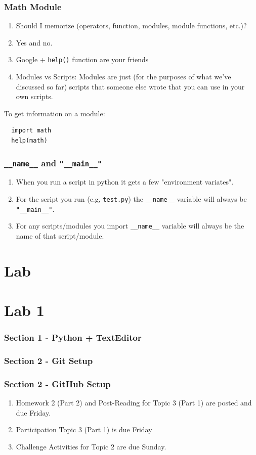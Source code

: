 \documentclass{beamer}
\begin{document}
\begin{frame}[fragile]
  \frametitle{Math Module}
  \begin{enumerate}[A]
    \item Should I memorize (operators, function, modules, module functions, etc.)?
    \item Yes and no. 
    \item Google + \lstinline|help()| function are your friends
    \item Modules vs Scripts: Modules are just (for the purposes of what we've discussed so far) scripts that someone else wrote that you can use in your own scripts.
  \end{enumerate}
  \vfill
  To get information on a module:
  \begin{lstlisting}
  import math
  help(math)
  \end{lstlisting}
\end{frame}

\begin{frame}
  \frametitle{\lstinline|__name__| and \lstinline|"__main__"|}

  \begin{enumerate}
    \item When you run a script in python it gets a few "environment variates".
    \item For the script you run (e.g, \lstinline|test.py|) the \lstinline|__name__| variable will always be \lstinline|"__main__"|.
    \item For any scripts/modules you import \lstinline|__name__| variable will always be the name of that script/module.
  \end{enumerate}
\end{frame}

\section{Lab}


\section{Lab 1}

\begin{frame}
  \frametitle{Section 1 - Python + TextEditor}
\end{frame}

\begin{frame}
  \frametitle{Section 2  - Git Setup}
\end{frame}

\begin{frame}
  \frametitle{Section 2  - GitHub Setup}
\end{frame}

%
%
%
\begin{frame}
  \begin{enumerate}
    \item Homework 2 (Part 2) and Post-Reading for Topic 3 (Part 1) are posted and due Friday.
    \item Participation Topic 3 (Part 1) is due Friday
    \item Challenge Activities for Topic 2 are due Sunday.
  \end{enumerate}
\end{frame}
\end{document}
